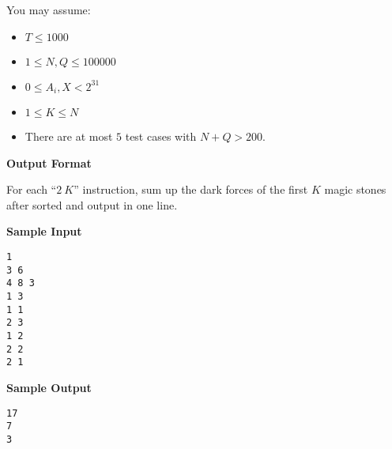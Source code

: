 You may assume:
\begin{itemize}
    \tightlist{}
    \item $T \le 1000$
    \item $1 \le N, Q \le 100000$
    \item $0 \le A_i, X < 2^{31}$
    \item $1 \le K \le N$
    \item There are at most $5$ test cases with $N + Q > 200$.
\end{itemize}


\textbf{\large Output Format}

For each ``$2\ K$'' instruction, sum up the dark forces of the first $K$ magic stones after sorted
and output in one line.

\textbf{\large Sample Input}

\begin{verbatim}
1
3 6
4 8 3
1 3
1 1
2 3
1 2
2 2
2 1
\end{verbatim}

\textbf{\large Sample Output}
\begin{verbatim}
17
7
3
\end{verbatim}

